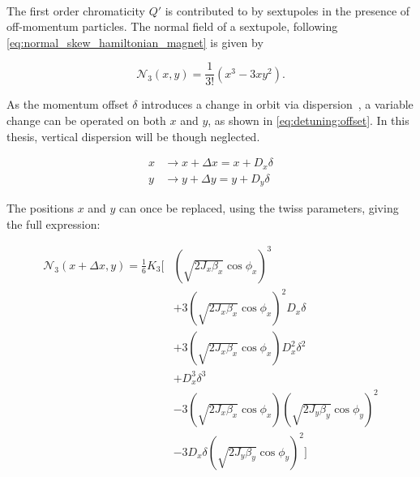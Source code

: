 \paragraph{}
\label{subsubsection:linear_chroma}

The first order chromaticity $Q'$ is contributed to by sextupoles in the presence of off-momentum
particles. The normal field of a sextupole, following \cref{eq:normal_skew_hamiltonian_magnet}
is given by

\begin{equation}
    \mathcal{N}_3(x,y) = \frac{1}{3!} (x^3 - 3xy^2).
    \label{eq:detuning:linear_chromaticity}
\end{equation}

As the momentum offset $\delta$ introduces a change in orbit via
dispersion~\cite{keintzel_second-order_2019}, a variable change can be operated on both $x$ and $y$,
as shown in \cref{eq:detuning:offset}. In this thesis, vertical dispersion will be though
neglected.

\begin{equation}
    \begin{aligned}
        x &\rightarrow x + \Delta x = x + D_x\delta \\
        y &\rightarrow y + \Delta y = y + D_y\delta
    \end{aligned}
    \label{eq:detuning:offset}
\end{equation}

The positions $x$ and $y$ can once be replaced, using the twiss parameters, giving the full
expression:

\begin{equation}\begin{aligned}
  \mathcal{N}_3(x + \Delta x, y) = \frac{1}{6} K_3 \biggl[&
       \left(\sqrt{2 J_x \beta_x} \cos \phi_x\right)^3 \\
  &    + 3 \left(\sqrt{2 J_x \beta_x} \cos \phi_x\right)^2 D_x \delta \\
  &    + 3 \left(\sqrt{2 J_x \beta_x} \cos \phi_x\right) D_x^2 \delta^2 \\
  &    + D_x^3 \delta^3 \\
  &    - 3 \left(\sqrt{2 J_x \beta_x} \cos \phi_x \right) \left(\sqrt{2 J_y \beta_y} \cos \phi_y \right)^2 \\
  &    - 3 D_x \delta (\sqrt{2 J_y \beta_y} \cos \phi_y)^2 \biggl]
\end{aligned}\end{equation}

